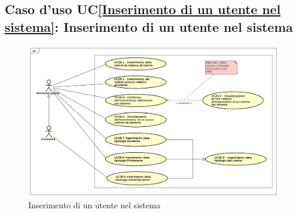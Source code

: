 \subsection{Caso d'uso UC\ref{Inserimento di un utente nel sistema}: Inserimento di un utente nel sistema}
\begin{figure} [H]
	\centering
	\includegraphics[scale=0.45]{./img/UseCaseDiagram028.png}
	\caption{Inserimento di un utente nel sistema}\label{}
\end{figure}

